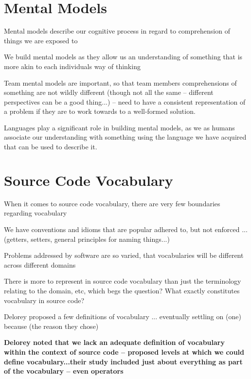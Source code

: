 
\section{Mental Models} %
\label{sec:mental_models}

Mental models describe our cognitive process in regard to comprehension of things we are exposed to 

We build mental models as they allow us an understanding of something that is more akin to each individuals way of thinking

Team mental models are important, so that team members comprehensions of something are not wildly different (though not all the same -- different perspectives can be a good thing...) -- need to have a consistent representation of a problem if they are to work towards to a well-formed solution.

Languages play a significant role in building mental models, as we as humans associate our understanding with something using the language we have acquired that can be used to describe it.


\section{Source Code Vocabulary} %
\label{sec:source_code_vocabulary}

When it comes to source code vocabulary, there are very few boundaries regarding vocabulary

We have conventions and idioms that are popular adhered to, but not enforced ... (getters, setters, general principles for naming things...)

Problems addressed by software are so varied, that vocabularies will be different across different domains

There is more to represent in source code vocabulary than just the terminology relating to the domain, etc, which begs the question? What exactly constitutes vocabulary in source code?

Delorey \etal proposed a few definitions of vocabulary ... eventually settling on (one) because (the reason they chose)

\textbf{Delorey noted that we lack an adequate definition of vocabulary within the context of source code -- proposed levels at which we could define vocabulary...their study included just about everything as part of the vocabulary -- even operators}

